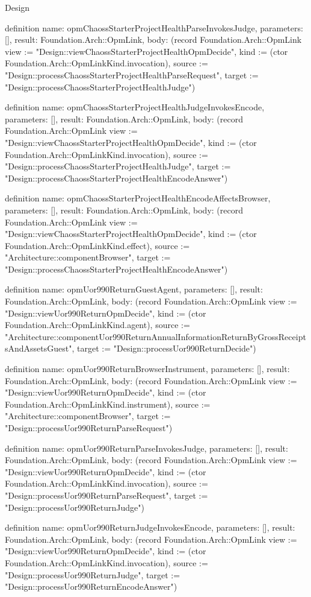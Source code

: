 \begin{lexlean}{Design}
\begin{semanticmodule}
definition{
  name: opmChaossStarterProjectHealthParseInvokesJudge,
  parameters: [],
  result: Foundation.Arch::OpmLink,
  body: (record Foundation.Arch::OpmLink {view := "Design::viewChaossStarterProjectHealthOpmDecide", kind := (ctor Foundation.Arch::OpmLinkKind.invocation), source := "Design::processChaossStarterProjectHealthParseRequest", target := "Design::processChaossStarterProjectHealthJudge"})
}

definition{
  name: opmChaossStarterProjectHealthJudgeInvokesEncode,
  parameters: [],
  result: Foundation.Arch::OpmLink,
  body: (record Foundation.Arch::OpmLink {view := "Design::viewChaossStarterProjectHealthOpmDecide", kind := (ctor Foundation.Arch::OpmLinkKind.invocation), source := "Design::processChaossStarterProjectHealthJudge", target := "Design::processChaossStarterProjectHealthEncodeAnswer"})
}

definition{
  name: opmChaossStarterProjectHealthEncodeAffectsBrowser,
  parameters: [],
  result: Foundation.Arch::OpmLink,
  body: (record Foundation.Arch::OpmLink {view := "Design::viewChaossStarterProjectHealthOpmDecide", kind := (ctor Foundation.Arch::OpmLinkKind.effect), source := "Architecture::componentBrowser", target := "Design::processChaossStarterProjectHealthEncodeAnswer"})
}

definition{
  name: opmUor990ReturnGuestAgent,
  parameters: [],
  result: Foundation.Arch::OpmLink,
  body: (record Foundation.Arch::OpmLink {view := "Design::viewUor990ReturnOpmDecide", kind := (ctor Foundation.Arch::OpmLinkKind.agent), source := "Architecture::componentUor990ReturnAnnualInformationReturnByGrossReceiptsAndAssetsGuest", target := "Design::processUor990ReturnDecide"})
}

definition{
  name: opmUor990ReturnBrowserInstrument,
  parameters: [],
  result: Foundation.Arch::OpmLink,
  body: (record Foundation.Arch::OpmLink {view := "Design::viewUor990ReturnOpmDecide", kind := (ctor Foundation.Arch::OpmLinkKind.instrument), source := "Architecture::componentBrowser", target := "Design::processUor990ReturnParseRequest"})
}

definition{
  name: opmUor990ReturnParseInvokesJudge,
  parameters: [],
  result: Foundation.Arch::OpmLink,
  body: (record Foundation.Arch::OpmLink {view := "Design::viewUor990ReturnOpmDecide", kind := (ctor Foundation.Arch::OpmLinkKind.invocation), source := "Design::processUor990ReturnParseRequest", target := "Design::processUor990ReturnJudge"})
}

definition{
  name: opmUor990ReturnJudgeInvokesEncode,
  parameters: [],
  result: Foundation.Arch::OpmLink,
  body: (record Foundation.Arch::OpmLink {view := "Design::viewUor990ReturnOpmDecide", kind := (ctor Foundation.Arch::OpmLinkKind.invocation), source := "Design::processUor990ReturnJudge", target := "Design::processUor990ReturnEncodeAnswer"})
}


\end{semanticmodule}
\end{lexlean}
